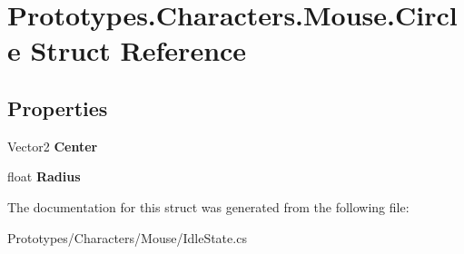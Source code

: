 \hypertarget{struct_prototypes_1_1_characters_1_1_mouse_1_1_circle}{}\section{Prototypes.\+Characters.\+Mouse.\+Circle Struct Reference}
\label{struct_prototypes_1_1_characters_1_1_mouse_1_1_circle}
\subsection*{Properties}
\begin{DoxyCompactItemize}
\item 
\mbox{\label{struct_prototypes_1_1_characters_1_1_mouse_1_1_circle_aef0c0522f9faa91b8c211372105bb65d}} 
Vector2 {\bfseries Center}
\item 
\mbox{\label{struct_prototypes_1_1_characters_1_1_mouse_1_1_circle_acca700462c4d62cd580bcd31b414f0b2}} 
float {\bfseries Radius}
\end{DoxyCompactItemize}


The documentation for this struct was generated from the following file\+:\begin{DoxyCompactItemize}
\item 
Prototypes/\+Characters/\+Mouse/Idle\+State.\+cs\end{DoxyCompactItemize}
